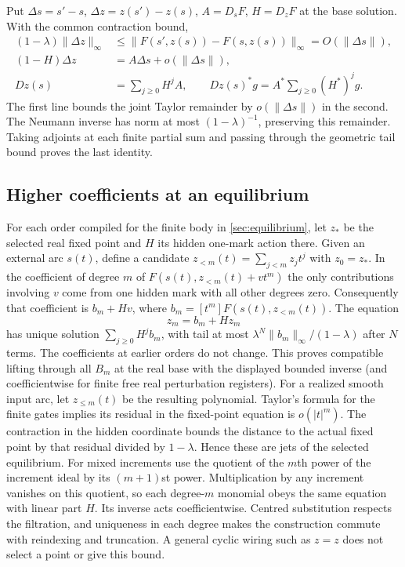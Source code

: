 \documentclass[11pt,a4paper]{article}
\theoremstyle{definition}
\theoremstyle{remark}\newaliascnt{remark}{theorem}
\numberwithin{equation}{section}
\begin{document}
Put \(\Delta s=s'-s\), \(\Delta z=z(s')-z(s)\), \(A=D_sF\), \(H=D_zF\) at the base solution. With the common contraction bound,
\[
\begin{aligned}
 (1-\lambda)\|\Delta z\|_\infty
    &\le\|F(s',z(s))-F(s,z(s))\|_\infty=O(\|\Delta s\|),\\
 (1-H)\Delta z&=A\Delta s+o(\|\Delta s\|),\\
 Dz(s)&=\sum_{j\ge0}H^jA,\qquad
 Dz(s)^*g=A^*\sum_{j\ge0}(H^*)^jg .
\end{aligned}
\]
The first line bounds the joint Taylor remainder by \(o(\|\Delta s\|)\) in the second. The Neumann inverse has norm at most \((1-\lambda)^{-1}\), preserving this remainder. Taking adjoints at each finite partial sum and passing through the geometric tail bound proves the last identity.

\subsection{Higher coefficients at an equilibrium}
For each order compiled for the finite body in \cref{sec:equilibrium}, let $z_*$ be the selected real fixed point and $H$ its hidden one-mark action there. Given an external arc $s(t)$, define a candidate $z_{<m}(t)=\sum_{j<m}z_jt^j$ with $z_0=z_*$. In the coefficient of degree $m$ of $F(s(t),z_{<m}(t)+vt^m)$ the only contributions involving $v$ come from one hidden mark with all other degrees zero. Consequently that coefficient is $b_m+Hv$, where $b_m=[t^m]F(s(t),z_{<m}(t))$. The equation
\[
             z_m=b_m+H z_m
\]
has unique solution $\sum_{j\ge0}H^j b_m$, with tail at most $\lambda^N\|b_m\|_\infty/(1-\lambda)$ after $N$ terms. The coefficients at earlier orders do not change. This proves compatible lifting through all $B_m$ at the real base with the displayed bounded inverse (and coefficientwise for finite free real perturbation registers). For a realized smooth input arc, let $z_{\le m}(t)$ be the resulting polynomial. Taylor's formula for the finite gates implies its residual in the fixed-point equation is $o(|t|^m)$. The contraction in the hidden coordinate bounds the distance to the actual fixed point by that residual divided by $1-\lambda$. Hence these are jets of the selected equilibrium. For mixed increments use the quotient of the $m$th power of the increment ideal by its $(m+1)$st power. Multiplication by any increment vanishes on this quotient, so each degree-$m$ monomial obeys the same equation with linear part $H$. Its inverse acts coefficientwise. Centred substitution respects the filtration, and uniqueness in each degree makes the construction commute with reindexing and truncation. A general cyclic wiring such as $z=z$ does not select a point or give this bound.
\end{document}
